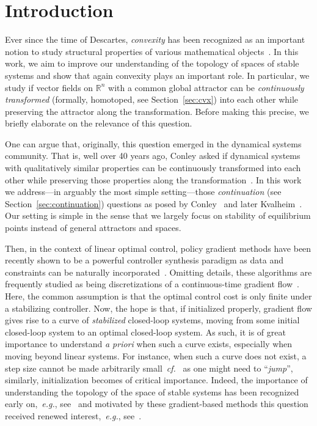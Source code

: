 \documentclass[letterpaper, 10 pt, conference]{ieeeconf}  %
\theoremstyle{mystyle}
\begin{document}
\section{Introduction}
\label{sec:introduction}
{
Ever since the time of Descartes, \textit{convexity} has been recognized as an important notion to study structural properties of various mathematical objects~\cite{ref:fenchel1983convexity}. In this work, we aim to improve our understanding of the topology of spaces of stable systems and show that again convexity plays an important role. In particular, we study if vector fields on $\mathbb{R}^n$ with a common global attractor can be \textit{continuously transformed} (formally, homotoped, see Section~\ref{sec:cvx}) into each other while preserving the attractor along the transformation. Before making this precise, we briefly elaborate on the relevance of this question.

One can argue that, originally, this question emerged in the dynamical systems community. That is, well over 40 years ago, Conley asked if dynamical systems with qualitatively similar properties can be continuously transformed into each other while preserving those properties along the transformation~\cite[p.~83]{ref:conley1978isolated}. In this work we address---in arguably the most simple setting---those \textit{continuation} (see Section~\ref{sec:continuation}) questions as posed by Conley~\cite{ref:conley1978isolated} and later Kvalheim~\cite{ref:kvalheim2022obstructions}. Our setting is simple in the sense that we largely focus on stability of equilibrium points instead of general attractors and spaces. 

Then, in the context of linear optimal control, policy gradient methods have been recently shown to be a powerful controller synthesis paradigm as data and constraints can be naturally incorporated~\cite{ref:hu2023toward}. Omitting details, these algorithms are frequently studied as being discretizations of a continuous-time gradient flow~\cite{ref:bu2019lqr}. Here, the common assumption is that the optimal control cost is only finite under a stabilizing controller. Now, the hope is that, if initialized properly, gradient flow gives rise to a curve of \textit{stabilized} closed-loop systems, moving from some initial closed-loop system to an optimal closed-loop system. As such, it is of great importance to understand \textit{a priori} when such a curve exists, especially when moving beyond linear systems. 
For instance, when such a curve does not exist, a step size cannot be made arbitrarily small~\textit{cf.}~\cite[Thm.~1]{ref:hu2023toward} as one might need to ``\textit{jump}'', similarly, initialization becomes of critical importance. Indeed, the importance of understanding the topology of the space of stable systems has been recognized early on,~\textit{e.g.}, see~\cite{Brockett1,ober1987topology} and motivated by these gradient-based methods this question received renewed interest,~\textit{e.g.}, see~\cite{ref:feng2019exponential,ref:bu2019lqr,ref:bu2020topological}.  

}
\end{document}
